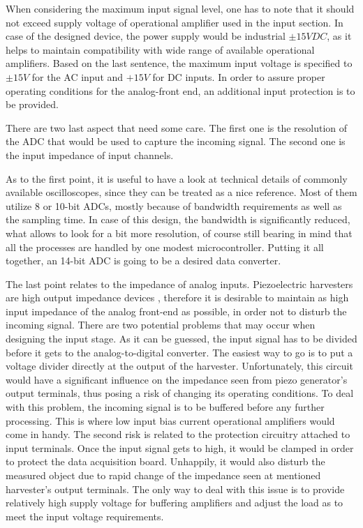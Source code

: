 \documentclass[12pt,a4paper]{article}
\begin{document}
When considering the maximum input signal level, one has to note that it should not exceed supply voltage of operational amplifier used in the input section. In case of the designed device, the power supply would be industrial $\pm{15}VDC$, as it helps to maintain compatibility with wide range of available operational amplifiers. Based on the last sentence, the maximum input voltage is specified to $\pm{15}V$ for the AC input and $+{15}V$ for DC inputs. In order to assure proper operating conditions for the analog-front end, an additional input protection is to be provided.
\par
There are two last aspect that need some care. The first one is the resolution of the ADC that would be used to capture the incoming signal. The second one is the input impedance of input channels.
\par
As to the first point, it is useful to have a look at technical details of commonly available oscilloscopes, since they can be treated as a nice reference. Most of them utilize 8 or 10-bit ADCs, mostly because of bandwidth requirements as well as the sampling time. In case of this design, the bandwidth is significantly reduced, what allows to look for a bit more resolution, of course still bearing in mind that all the processes are handled by one modest microcontroller. Putting it all together, an 14-bit ADC is going to be a desired data converter.
\par
The last point relates to the impedance of analog inputs. Piezoelectric harvesters are high output impedance devices \cite{EnHv1}, therefore it is desirable to maintain as high input impedance of the analog front-end as possible, in order not to disturb the incoming signal. There are two potential problems that may occur when designing the input stage. As it can be guessed, the input signal has to be divided before it gets to the analog-to-digital converter. The easiest way to go is to put a voltage divider directly at the output of the harvester. Unfortunately, this circuit would have a significant influence on the impedance seen from piezo generator's output terminals, thus posing a risk of changing its operating conditions. To deal with this problem, the incoming signal is to be buffered before any further processing. This is where low input bias current operational amplifiers would come in handy. The second risk is related to the protection circuitry attached to input terminals. Once the input signal gets to high, it would be clamped in order to protect the data acquisition board. Unhappily, it would also disturb the measured object due to rapid change of the impedance seen at mentioned harvester's output terminals. The only way to deal with this issue is to provide relatively high supply voltage for buffering amplifiers and adjust the load as to meet the input voltage requirements.
\par
\end{document}
